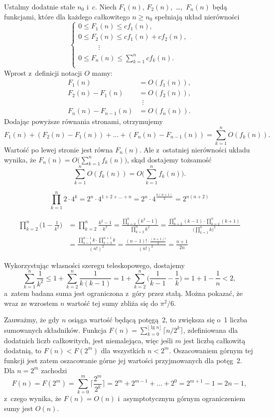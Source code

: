 Ustalmy dodatnie stałe $n_0$ i~$c$. Niech $F_1(n)$, $F_2(n)$,~\dots,~$F_n(n)$ będą funkcjami, które dla każdego całkowitego $n\ge n_0$ spełniają układ nierówności
\[
	\begin{cases}
		0 \le F_1(n) \le cf_1(n), \\
		0 \le F_2(n) \le cf_1(n)+cf_2(n), \\
		\phantom{0 \le F_2} \vdots \\
		0 \le F_n(n) \le \sum_{k=1}^ncf_k(n). \\
	\end{cases}
\]
Wprost z~definicji notacji $O$ mamy:
\begin{align*}
	F_1(n) &= O(f_1(n)), \\
	F_2(n)-F_1(n) &= O(f_2(n)), \\
	& \,\,\,\vdots \\
	F_n(n)-F_{n-1}(n) &= O(f_n(n)).
\end{align*}
Dodając powyższe równania stronami, otrzymujemy
\[
	F_1(n)+(F_2(n)-F_1(n))+\dots+(F_n(n)-F_{n-1}(n)) = \sum_{k=1}^nO(f_k(n)).
\]
Wartość po lewej stronie jest równa $F_n(n)$. Ale z~ostatniej nierówności układu wynika, że $F_n(n)=O\bigl(\sum_{k=1}^nf_k(n)\bigr)$, skąd dostajemy tożsamość
\[
	\sum_{k=1}^nO(f_k(n)) = O\biggl(\sum_{k=1}^nf_k(n)\biggr).
\]

\exercise %
\[
	\prod_{k=1}^n2\cdot4^k = 2^n\cdot4^{1+2+\dots+n} = 2^n\cdot4^{\frac{n(n+1)}{2}} = 2^{n(n+2)}
\]

\exercise %
\begin{align*}
	\prod_{k=2}^n\biggl(1-\frac{1}{k^2}\biggr) &= \prod_{k=2}^n\frac{k^2-1}{k^2} = \frac{\prod_{k=2}^n(k^2-1)}{\prod_{k=2}^nk^2} = \frac{\prod_{k=2}^n(k-1)\cdot\prod_{k=2}^n(k+1)}{\bigl(\prod_{k=1}^nk\bigr)^2} \\[2mm]
	&= \frac{\prod_{k=1}^{n-1}k\cdot\prod_{k=3}^{n+1}k}{(n!)^2} = \frac{(n-1)!\cdot\frac{(n+1)!}{2}}{(n!)^2} = \frac{n+1}{2n}
\end{align*}


\exercise %
Wykorzystując własności szeregu teleskopowego, dostajemy
\[
	\sum_{k=1}^n\frac{1}{k^2} \le 1+\sum_{k=2}^n\frac{1}{k(k-1)} = 1+\sum_{k=2}^n\biggl(\frac{1}{k-1}-\frac{1}{k}\biggr) = 1+1-\frac{1}{n} < 2,
\]
a~zatem badana suma jest ograniczona z~góry przez stałą. Można pokazać, że wraz ze wzrostem $n$ wartość tej sumy zbliża się do $\pi^2\!/6$.

\exercise %
Zauważmy, że gdy $n$ osiąga wartość będącą potęgą~2, to zwiększa się o~1 liczba sumowanych składników. Funkcja $F(n)=\sum_{k=0}^{\lfloor\lg n\rfloor}\bigl\lceil n/2^k\bigr\rceil$, zdefiniowana dla dodatnich liczb całkowitych, jest niemalejąca, więc jeśli $m$ jest liczbą całkowitą dodatnią, to $F(n)<F(2^m)$ dla wszystkich $n<2^m$. Oszacowaniem górnym tej funkcji jest zatem oszacowanie górne jej wartości przyjmowanych dla potęg~2. Dla $n=2^m$ zachodzi
\[
	F(n) = F(2^m) = \sum_{k=0}^m\biggl\lceil\frac{2^m}{2^k}\biggr\rceil = 2^m+2^{m-1}+\dots+2^0 = 2^{m+1}-1 = 2n-1,
\]
z~czego wynika, że $F(n)=O(n)$ i~asymptotycznym górnym ograniczeniem sumy jest $O(n)$.

